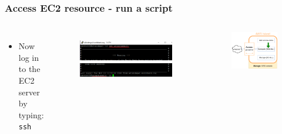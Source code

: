 \documentclass[aspectratio=169]{beamer} %
\begin{document}
\begin{frame}
	\frametitle{Access EC2 resource - run a script}
	\begin{columns}[c]
		\begin{itemize}
			\item Now log in to the EC2 server by typing: \newline \texttt{ssh \ectwoName}
		\end{itemize}
		
		\begin{figure}
			\centering
			\includegraphics[width=\textwidth]{./img/access-3a.png}
			\includegraphics[width=\textwidth]{./img/access-3b.png}
		\end{figure}
		
		\begin{figure}
			\centering
			\includegraphics[width=\textwidth]{./img/wb-aws-ec2.png}
		\end{figure}
		
	\end{columns}
\end{frame}
\end{document}
